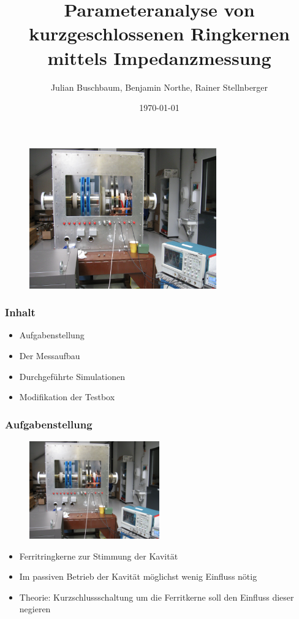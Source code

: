 \documentclass[accentcolor=tud9b, colorbacktitle, inverttitle]{tudbeamer}
\author{Julian Buschbaum, Benjamin Northe, Rainer Stellnberger}
\institute{Institut TEMF}
\date{\today}
\title{Parameteranalyse von kurzgeschlossenen Ringkernen mittels Impedanzmessung}
\begin{document}
\begin{titleframe}
\vspace{-1em}
	\begin{figure}[h]
		\centering
		\includegraphics[width=0.72\textwidth]{Kavitaet}
	\end{figure}
\end{titleframe}





\begin{frame}\frametitle{Inhalt}
	\begin{itemize}
		\item Aufgabenstellung
		\item Der Messaufbau
		\item Durchgef\"uhrte Simulationen
		\item Modifikation der Testbox
	\end{itemize}
\end{frame}


\begin{frame}\frametitle{Aufgabenstellung}
\begin{multicols}{2}
\vspace{-2em}
	\begin{figure}[h]
		\centering
		\includegraphics[width=0.5\textwidth]{Kavitaet}
	\end{figure}
	\vfill\null
	\columnbreak
	\begin{itemize}
		\item Ferritringkerne zur Stimmung der Kavit\"at
		\item Im passiven Betrieb der Kavit\"at m\"oglichst wenig Einfluss n\"otig
		\item Theorie: Kurzschlussschaltung um die Ferritkerne soll den Einfluss dieser negieren
	\end{itemize}
\end{multicols}
\end{frame}
\end{document}
